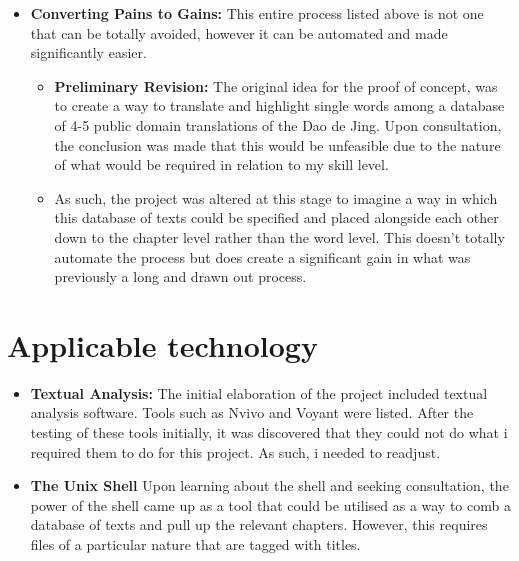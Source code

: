 \documentclass{article}
\begin{document}
\begin{itemize}

\item{\textbf{Converting Pains to Gains:} This entire process listed above is not one that can be totally avoided, however it can be automated and made significantly easier.}

\begin{itemize}

\item{\textbf{Preliminary Revision:} The original idea for the proof of concept, was to create a way to translate and highlight single words among a database of 4-5 public domain translations of the Dao de Jing. Upon consultation, the conclusion was made that this would be unfeasible due to the nature of what would be required in relation to my skill level.}

\item{As such, the project was altered at this stage to imagine a way in which this database of texts could be specified and placed alongside each other down to the chapter level rather than the word level. This doesn't totally automate the process but does create a significant gain in what was previously a long and drawn out process.}


\end{itemize}

\end{itemize}

\section{Applicable technology}

\begin{itemize}

\item{\textbf{Textual Analysis:} The initial elaboration of the project included textual analysis software. Tools such as Nvivo and Voyant were listed. After the testing of these tools initially, it was discovered that they could not do what i required them to do for this project. As such, i needed to readjust.}

\item{\textbf{The Unix Shell} Upon learning about the shell and seeking consultation, the power of the shell came up as a tool that could be utilised as a way to comb a database of texts and pull up the relevant chapters. However, this requires files of a particular nature that are tagged with titles.}

\end{itemize}
\end{document}
